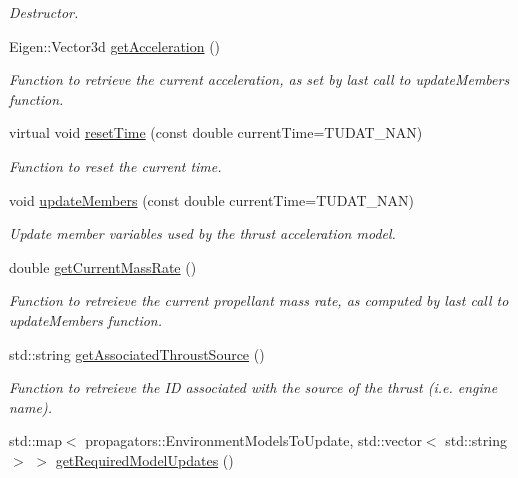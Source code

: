 \begin{DoxyCompactItemize}
\begin{DoxyCompactList}\small\item\em Destructor. \end{DoxyCompactList}\item 
Eigen\+::\+Vector3d \hyperlink{classtudat_1_1propulsion_1_1ThrustAcceleration_a85c999d6b3fc6b093e6990e2997918f6}{get\+Acceleration} ()
\begin{DoxyCompactList}\small\item\em Function to retrieve the current acceleration, as set by last call to update\+Members function. \end{DoxyCompactList}\item 
virtual void \hyperlink{classtudat_1_1propulsion_1_1ThrustAcceleration_a2ef613d32d6b4cad26aece57d6171127}{reset\+Time} (const double current\+Time=T\+U\+D\+A\+T\+\_\+\+N\+AN)
\begin{DoxyCompactList}\small\item\em Function to reset the current time. \end{DoxyCompactList}\item 
void \hyperlink{classtudat_1_1propulsion_1_1ThrustAcceleration_a847904c69ea6ced5ac3396f7ecdf2f78}{update\+Members} (const double current\+Time=T\+U\+D\+A\+T\+\_\+\+N\+AN)
\begin{DoxyCompactList}\small\item\em Update member variables used by the thrust acceleration model. \end{DoxyCompactList}\item 
double \hyperlink{classtudat_1_1propulsion_1_1ThrustAcceleration_a356aa0c4af45bf67d205c480b62546dd}{get\+Current\+Mass\+Rate} ()
\begin{DoxyCompactList}\small\item\em Function to retreieve the current propellant mass rate, as computed by last call to update\+Members function. \end{DoxyCompactList}\item 
std\+::string \hyperlink{classtudat_1_1propulsion_1_1ThrustAcceleration_a8225b0a9c42fe43f2a7843eb9928ce7c}{get\+Associated\+Throust\+Source} ()
\begin{DoxyCompactList}\small\item\em Function to retreieve the ID associated with the source of the thrust (i.\+e. engine name). \end{DoxyCompactList}\item 
std\+::map$<$ propagators\+::\+Environment\+Models\+To\+Update, std\+::vector$<$ std\+::string $>$ $>$ \hyperlink{classtudat_1_1propulsion_1_1ThrustAcceleration_a936393a7c5a988fa3c0bc234eac92587}{get\+Required\+Model\+Updates} ()

\end{DoxyCompactItemize}
